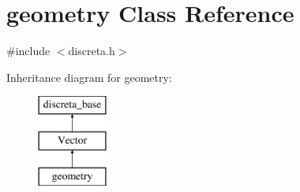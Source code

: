 \hypertarget{classgeometry}{}\section{geometry Class Reference}
\label{classgeometry}


{\ttfamily \#include $<$discreta.\+h$>$}

Inheritance diagram for geometry\+:\begin{figure}[H]
\begin{center}
\leavevmode
\includegraphics[height=3.000000cm]{classgeometry}
\end{center}
\end{figure}
